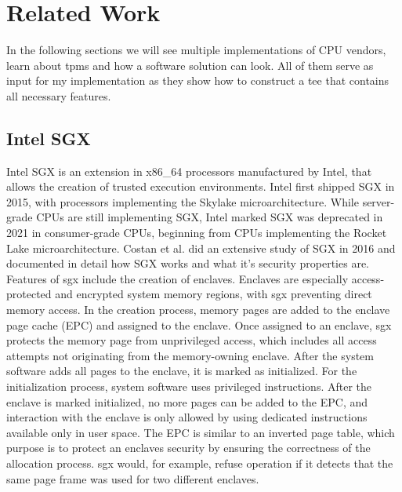 \chapter{Related Work}
\label{chap:related}

In the following sections we will see multiple implementations of CPU vendors,
learn about \glspl{tpm} and how a software solution can look. All of them serve
as input for my implementation as they show how to construct a \gls{tee} that
contains all necessary features.

\section{Intel SGX}
\label{sec:20:sgx}
Intel SGX is an extension in x86\_64 processors manufactured by Intel, that
allows the creation of trusted execution environments. Intel first shipped SGX
in 2015, with processors implementing the Skylake microarchitecture. While
server-grade CPUs are still implementing SGX, Intel marked SGX was deprecated in
2021 in consumer-grade CPUs, beginning from CPUs implementing the Rocket Lake
microarchitecture. Costan et al. did an extensive study of SGX in 2016 and
documented in detail how SGX works and what it's security properties
are.\cite{costan2016intel} \\

Features of \gls{sgx} include the creation of enclaves. Enclaves are especially
access-protected and encrypted system memory regions, with \gls{sgx} preventing direct
memory access. In the creation process, memory pages are added to the enclave
page cache (EPC) and assigned to the enclave. Once assigned to an enclave, \gls{sgx}
protects the memory page from unprivileged access, which includes all access
attempts not originating from the memory-owning enclave. After the system
software adds all pages to the enclave, it is marked as initialized. For the
initialization process, system software uses privileged instructions. After the
enclave is marked initialized, no more pages can be added to the EPC, and
interaction with the enclave is only allowed by using dedicated instructions
available only in user space. The EPC is similar to an inverted page table,
which purpose is to protect an enclaves security by ensuring the correctness of
the allocation process. \gls{sgx} would, for example, refuse operation if it detects
that the same page frame was used for two different enclaves.\\

